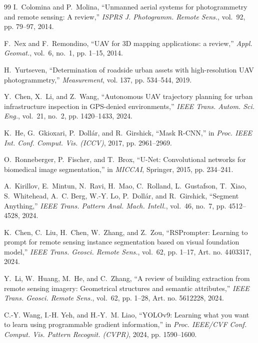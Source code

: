 \documentclass[conference]{IEEEtran}
\begin{document}
\begin{thebibliography}{99}
I.~Colomina and P.~Molina, ``Unmanned aerial systems for photogrammetry and remote sensing: A review,'' \emph{ISPRS J. Photogramm. Remote Sens.}, vol.~92, pp. 79--97, 2014.

F.~Nex and F.~Remondino, ``UAV for 3D mapping applications: a review,'' \emph{Appl. Geomat.}, vol.~6, no.~1, pp. 1--15, 2014.

H.~Yurtseven, ``Determination of roadside urban assets with high-resolution UAV photogrammetry,'' \emph{Measurement}, vol. 137, pp. 534--544, 2019.

Y.~Chen, X.~Li, and Z.~Wang, ``Autonomous UAV trajectory planning for urban infrastructure inspection in GPS-denied environments,'' \emph{IEEE Trans. Autom. Sci. Eng.}, vol.~21, no.~2, pp. 1420--1433, 2024.

K.~He, G.~Gkioxari, P.~Doll{\'a}r, and R.~Girshick, ``Mask R-CNN,'' in \emph{Proc. IEEE Int. Conf. Comput. Vis. (ICCV)}, 2017, pp. 2961--2969.

O.~Ronneberger, P.~Fischer, and T.~Brox, ``U-Net: Convolutional networks for biomedical image segmentation,'' in \emph{MICCAI}, Springer, 2015, pp. 234--241.

A.~Kirillov, E.~Mintun, N.~Ravi, H.~Mao, C.~Rolland, L.~Gustafson, T.~Xiao, S.~Whitehead, A.~C. Berg, W.-Y. Lo, P.~Doll{\'a}r, and R.~Girshick, ``Segment Anything,'' \emph{IEEE Trans. Pattern Anal. Mach. Intell.}, vol.~46, no.~7, pp. 4512--4528, 2024.

K.~Chen, C.~Liu, H.~Chen, W.~Zhang, and Z.~Zou, ``RSPrompter: Learning to prompt for remote sensing instance segmentation based on visual foundation model,'' \emph{IEEE Trans. Geosci. Remote Sens.}, vol.~62, pp. 1--17, Art. no. 4403317, 2024.

Y.~Li, W.~Huang, M.~He, and C.~Zhang, ``A review of building extraction from remote sensing imagery: Geometrical structures and semantic attributes,'' \emph{IEEE Trans. Geosci. Remote Sens.}, vol.~62, pp. 1--28, Art. no. 5612228, 2024.

C.-Y. Wang, I.-H. Yeh, and H.-Y.~M. Liao, ``YOLOv9: Learning what you want to learn using programmable gradient information,'' in \emph{Proc. IEEE/CVF Conf. Comput. Vis. Pattern Recognit. (CVPR)}, 2024, pp. 1590--1600.


\end{thebibliography}
\end{document}

